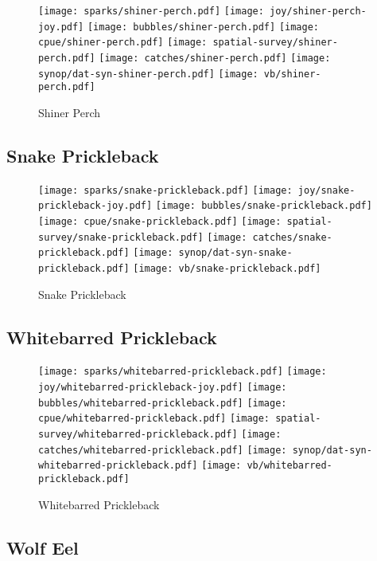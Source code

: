 \begin{figure}[htbp]
\centering
\texttt{[image: sparks/shiner-perch.pdf]}
\texttt{[image: joy/shiner-perch-joy.pdf]}
\texttt{[image: bubbles/shiner-perch.pdf]}
\texttt{[image: cpue/shiner-perch.pdf]}
\texttt{[image: spatial-survey/shiner-perch.pdf]}
\texttt{[image: catches/shiner-perch.pdf]}
\texttt{[image: synop/dat-syn-shiner-perch.pdf]}
\texttt{[image: vb/shiner-perch.pdf]}
\caption{Shiner Perch}
\end{figure}
\clearpage
\subsection*{Snake Prickleback}

\begin{figure}[htbp]
\centering
\texttt{[image: sparks/snake-prickleback.pdf]}
\texttt{[image: joy/snake-prickleback-joy.pdf]}
\texttt{[image: bubbles/snake-prickleback.pdf]}
\texttt{[image: cpue/snake-prickleback.pdf]}
\texttt{[image: spatial-survey/snake-prickleback.pdf]}
\texttt{[image: catches/snake-prickleback.pdf]}
\texttt{[image: synop/dat-syn-snake-prickleback.pdf]}
\texttt{[image: vb/snake-prickleback.pdf]}
\caption{Snake Prickleback}
\end{figure}
\clearpage
\subsection*{Whitebarred Prickleback}

\begin{figure}[htbp]
\centering
\texttt{[image: sparks/whitebarred-prickleback.pdf]}
\texttt{[image: joy/whitebarred-prickleback-joy.pdf]}
\texttt{[image: bubbles/whitebarred-prickleback.pdf]}
\texttt{[image: cpue/whitebarred-prickleback.pdf]}
\texttt{[image: spatial-survey/whitebarred-prickleback.pdf]}
\texttt{[image: catches/whitebarred-prickleback.pdf]}
\texttt{[image: synop/dat-syn-whitebarred-prickleback.pdf]}
\texttt{[image: vb/whitebarred-prickleback.pdf]}
\caption{Whitebarred Prickleback}
\end{figure}
\clearpage
\subsection*{Wolf Eel}

